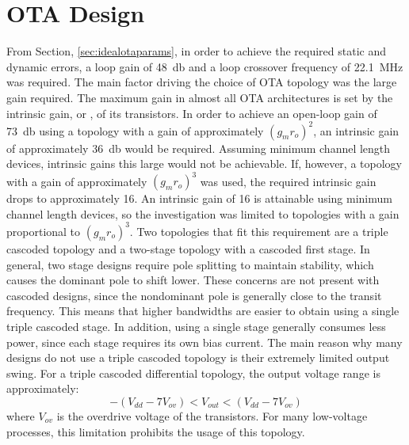 \section{OTA Design}
From Section, \ref{sec:idealotaparams}, in order to achieve the required static and dynamic errors, a loop gain of \SI{48}{\decibel} and a loop crossover frequency of \SI{22.1}{\mega\hertz} was required. The main factor driving the choice of OTA topology was the large gain required. The maximum gain in almost all OTA architectures is set by the intrinsic gain, \gmgds\spc or \gmro, of its transistors. In order to achieve an open-loop gain of \SI{73}{\decibel} using a topology with a gain of approximately $(g_mr_o)^2$, an intrinsic gain of approximately \SI{36}{\decibel} would be required. Assuming minimum channel length devices, intrinsic gains this large would not be achievable. If, however, a topology with a gain of approximately $(g_mr_o)^3$ was used, the required intrinsic gain drops to approximately 16. An intrinsic gain of 16 is attainable using minimum channel length devices, so the investigation was limited to topologies with a gain proportional to $(g_mr_o)^3$. Two topologies that fit this requirement are a triple cascoded topology and a two-stage topology with a cascoded first stage. In general, two stage designs require pole splitting to maintain stability, which causes the dominant pole to shift lower. These concerns are not present with cascoded designs, since the nondominant pole is generally close to the transit frequency. This means that higher bandwidths are easier to obtain using a single triple cascoded stage. In addition, using a single stage generally consumes less power, since each stage requires its own bias current. The main reason why many designs do not use a triple cascoded topology is their extremely limited output swing. For a triple cascoded differential topology, the output voltage range is approximately:
\begin{equation}
\label{eq:triplecascodeoutputswing}
-(V_{dd} - 7V_{ov}) < V_{out} < (V_{dd} - 7V_{ov})
\end{equation}
where $V_{ov}$ is the overdrive voltage of the transistors. For many low-voltage processes, this limitation prohibits the usage of this topology.

